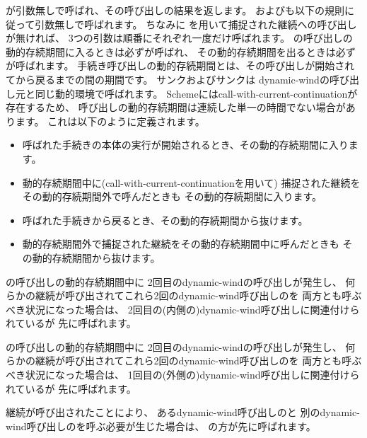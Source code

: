 \begin{entry}{%
}

が引数無しで呼ばれ、その呼び出しの結果を返します。
およびも以下の規則に従って引数無しで呼ばれます。
ちなみに
を用いて捕捉された継続への呼び出しが無ければ、
3つの引数は順番にそれぞれ一度だけ呼ばれます。
の呼び出しの動的存続期間に入るときは必ずが呼ばれ、
その動的存続期間を出るときは必ずが呼ばれます。
手続き呼び出しの動的存続期間とは、その呼び出しが開始されてから戻るまでの間の期間です。
サンクおよびサンクは
{\cf dynamic-wind}の呼び出し元と同じ動的環境で呼ばれます。
Schemeには{\cf call-with-current-continuation}が存在するため、
呼び出しの動的存続期間は連続した単一の時間でない場合があります。
これは以下のように定義されます。
\begin{itemize}
\item 呼ばれた手続きの本体の実行が開始されるとき、その動的存続期間に入ります。

\item 動的存続期間中に({\cf call-with-current-continuation}を用いて)
捕捉された継続をその動的存続期間外で呼んだときも
その動的存続期間に入ります。

\item 呼ばれた手続きから戻るとき、その動的存続期間から抜けます。

\item 動的存続期間外で捕捉された継続をその動的存続期間中に呼んだときも
その動的存続期間から抜けます。
\end{itemize}

の呼び出しの動的存続期間中に
2回目の{\cf dynamic-wind}の呼び出しが発生し、
何らかの継続が呼び出されてこれら2回の{\cf dynamic-wind}呼び出しのを
両方とも呼ぶべき状況になった場合は、
2回目の(内側の){\cf dynamic-wind}呼び出しに関連付けられているが
先に呼ばれます。

の呼び出しの動的存続期間中に
2回目の{\cf dynamic-wind}の呼び出しが発生し、
何らかの継続が呼び出されてこれら2回の{\cf dynamic-wind}呼び出しのを
両方とも呼ぶべき状況になった場合は、
1回目の(外側の){\cf dynamic-wind}呼び出しに関連付けられているが
先に呼ばれます。

継続が呼び出されたことにより、
ある{\cf dynamic-wind}呼び出しのと
別の{\cf dynamic-wind}呼び出しのを呼ぶ必要が生じた場合は、
の方が先に呼ばれます。


\end{entry}
